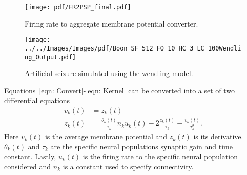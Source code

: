 \begin{figure}%
	\centering
		\texttt{[image: pdf/FR2PSP\_final.pdf]}
	\caption{Firing rate to aggregate membrane potential converter.}
	\label{fig: FR2PSP_final}
\end{figure} 
\begin{figure}%
	\centering
		\texttt{[image: ../../Images/Images/pdf/Boon\_SF\_512\_FO\_10\_HC\_3\_LC\_100Wendling\_Output.pdf]}
	\caption{Artificial seizure simulated using the wendling model.}
	\label{fig: SeizureSim}
\end{figure}
Equations~\ref{eqn: Convert}-\ref{eqn: Kernel} can be converted into a set of two differential equations \begin{align}%
\label{eqn: FR2PSP1}
\dot{v}_{k}(t)&= z_{k}(t)\\
\label{eqn: FR2PSP2}
\dot{z}_{k}(t)&=\frac{\theta_{k}(t)}{\tau_{k}}n_{k}u_{k}(t)-2\frac{z_{k}(t)}{\tau_{k}}-\frac{v_{k}(t)}{\tau_{k}^{2}}.
\end{align} Here $v_{k}(t)$ is the average membrane potential and $z_{k}(t)$ is its derivative. $\theta_{k}(t)$ and $\tau_{k}$ are the specific neural populations synaptic gain and time constant. Lastly, $u_{k}(t)$ is the firing rate to the specific neural population considered and $n_{k}$ is a constant used to specify connectivity.

